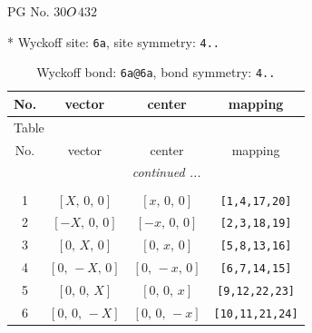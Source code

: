 \documentclass[fleqn,8pt]{jsarticle}
\begin{document}
\setcounter{MaxMatrixCols}{32}

\renewcommand{\tablename}{Table~}
\renewcommand{\figurename}{Figure~}
\begin{center}
\LARGE
PG No. 30\quad$O_{\rm }$\quad$432$\quad[ cubic ]
\end{center}


* Wyckoff site: {\tt 6a}, site symmetry: {\tt 4..}
\renewcommand{\arraystretch}{1.2}
\begin{longtable}{cccc}
\caption{Wyckoff bond: {\tt 6a@6a}, bond symmetry: {\tt 4..}}
 \\
 \hline \hline
No. & vector & center & mapping \\ \hline \endfirsthead

\multicolumn{3}{l}{\tablename\ \thetable{}} \\
 \hline \hline
No. & vector & center & mapping \\ \hline \endhead

 \hline \hline
\multicolumn{3}{r}{\footnotesize\it continued ...} \\ \endfoot

 \hline \hline
\multicolumn{3}{r}{} \\ \endlastfoot

1 & $\left[ X,\, 0,\, 0 \right]$ & $\left[ x,\, 0,\, 0 \right]$ & {\tt [1,4,17,20]} \\ \hline
2 & $\left[ - X,\, 0,\, 0 \right]$ & $\left[ - x,\, 0,\, 0 \right]$ & {\tt [2,3,18,19]} \\ \hline
3 & $\left[ 0,\, X,\, 0 \right]$ & $\left[ 0,\, x,\, 0 \right]$ & {\tt [5,8,13,16]} \\ \hline
4 & $\left[ 0,\, - X,\, 0 \right]$ & $\left[ 0,\, - x,\, 0 \right]$ & {\tt [6,7,14,15]} \\ \hline
5 & $\left[ 0,\, 0,\, X \right]$ & $\left[ 0,\, 0,\, x \right]$ & {\tt [9,12,22,23]} \\ \hline
6 & $\left[ 0,\, 0,\, - X \right]$ & $\left[ 0,\, 0,\, - x \right]$ & {\tt [10,11,21,24]} \\
\end{longtable}
\renewcommand{\arraystretch}{1.2}
\end{document}
